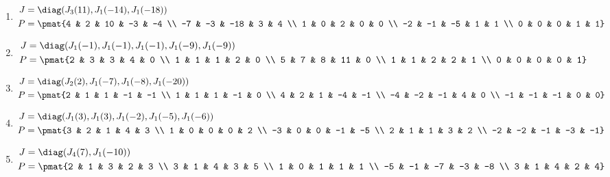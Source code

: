 \begin{enumerate}
\item

\begin{align*}
J &= \diag(J_{3}(11), J_{1}(-14), J_{1}(-18))\\
P &= \pmat{4 & 2 & 10 & -3 & -4 \\ -7 & -3 & -18 & 3 & 4 \\ 1 & 0 & 2 & 0 & 0 \\ -2 & -1 & -5 & 1 & 1 \\ 0 & 0 & 0 & 1 & 1}
\end{align*}

\item

\begin{align*}
J &= \diag(J_{1}(-1), J_{1}(-1), J_{1}(-1), J_{1}(-9), J_{1}(-9))\\
P &= \pmat{2 & 3 & 3 & 4 & 0 \\ 1 & 1 & 1 & 2 & 0 \\ 5 & 7 & 8 & 11 & 0 \\ 1 & 1 & 2 & 2 & 1 \\ 0 & 0 & 0 & 0 & 1}
\end{align*}

\item

\begin{align*}
J &= \diag(J_{2}(2), J_{1}(-7), J_{1}(-8), J_{1}(-20))\\
P &= \pmat{2 & 1 & 1 & -1 & -1 \\ 1 & 1 & 1 & -1 & 0 \\ 4 & 2 & 1 & -4 & -1 \\ -4 & -2 & -1 & 4 & 0 \\ -1 & -1 & -1 & 0 & 0}
\end{align*}

\item

\begin{align*}
J &= \diag(J_{1}(3), J_{1}(3), J_{1}(-2), J_{1}(-5), J_{1}(-6))\\
P &= \pmat{3 & 2 & 1 & 4 & 3 \\ 1 & 0 & 0 & 0 & 2 \\ -3 & 0 & 0 & -1 & -5 \\ 2 & 1 & 1 & 3 & 2 \\ -2 & -2 & -1 & -3 & -1}
\end{align*}

\item

\begin{align*}
J &= \diag(J_{4}(7), J_{1}(-10))\\
P &= \pmat{2 & 1 & 3 & 2 & 3 \\ 3 & 1 & 4 & 3 & 5 \\ 1 & 0 & 1 & 1 & 1 \\ -5 & -1 & -7 & -3 & -8 \\ 3 & 1 & 4 & 2 & 4}
\end{align*}


\end{enumerate}
